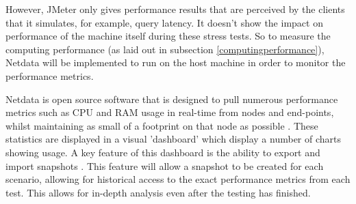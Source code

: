 However, JMeter only gives performance results that are perceived by the clients that it simulates, for example, query latency. It doesn't show the impact on performance of the machine itself during these stress tests. So to measure the computing performance (as laid out in subsection \ref{computingperformance}), Netdata will be implemented to run on the host machine in order to monitor the performance metrics.

Netdata is open source software that is designed to pull numerous performance metrics such as CPU and RAM usage in real-time from nodes and end-points, whilst maintaining as small of a footprint on that node as possible \citep{Netdata}. These statistics are displayed in a visual 'dashboard' which display a number of charts showing usage. A key feature of this dashboard is the ability to export and import snapshots \citep{netdatadashboard}. This feature will allow a snapshot to be created for each scenario, allowing for historical access to the exact performance metrics from each test. This allows for in-depth analysis even after the testing has finished.